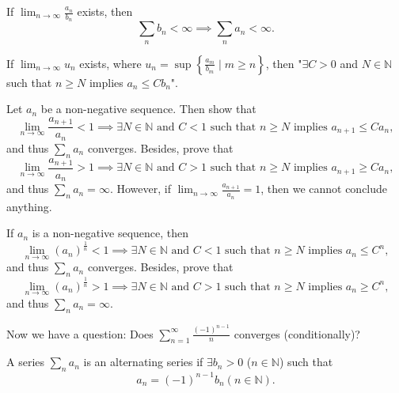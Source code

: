 \begin{corollary}
    If \(\lim_{n \to \infty} \frac{a_n}{b_n} \) exists, then 
    \[
        \sum_{n} b_n < \infty \implies \sum_{n} a_n < \infty. 
    \] 
\end{corollary}

\begin{exercise}
    If \(\lim_{n \to \infty} u_n\) exists, where \(u_n = \sup \left\{ \frac{a_m}{b_m} \mid m \ge n \right\} \), then "\(\exists C > 0\) and \(N \in \mathbb{N} \) such that \(n \ge N\) implies \(a_n \le C b_n\)".  
\end{exercise}
\begin{exercise}
    Let \(a_n\) be a non-negative sequence. Then show that 
    \[
        \lim_{n \to \infty} \frac{a_{n+1}}{a_n} < 1 \implies \exists N \in \mathbb{N} \text{ and } C < 1 \text{ such that } n \ge N \text{ implies } a_{n+1} \le C a_n,  
    \] and thus \(\sum_{n} a_n \) converges. Besides, prove that  
    \[
        \lim_{n \to \infty} \frac{a_{n+1}}{a_n} > 1 \implies \exists N \in \mathbb{N} \text{ and } C > 1 \text{ such that } n \ge N \text{ implies } a_{n+1} \ge C a_n,  
    \]and thus \(\sum_{n} a_n = \infty  \). However, if \(\lim_{n \to \infty} \frac{a_{n+1}}{a_n} = 1 \), then we cannot conclude anything.  
\end{exercise}
\begin{exercise}
    If \(a_n\) is a non-negative sequence, then 
    \[
        \lim_{n \to \infty} \left( a_n \right)^{\frac{1}{n}} < 1 \implies \exists N \in \mathbb{N} \text{ and } C < 1 \text{ such that } n \ge N \text{ implies } a_{n} \le C^n,
    \] and thus \(\sum_{n} a_n \) converges. Besides, prove that 
    \[
        \lim_{n \to \infty} \left( a_n \right)^{\frac{1}{n}} > 1 \implies \exists N \in \mathbb{N} \text{ and } C > 1 \text{ such that } n \ge N \text{ implies } a_{n} \ge C^n,
    \] and thus \(\sum_{n} a_n = \infty  \). 
\end{exercise}

Now we have a question: Does \(\sum_{n=1}^{\infty} \frac{(-1)^{n-1}}{n} \) converges (conditionally)?

\begin{definition}
    A series \(\sum_{n} a_n \) is an alternating series if \(\exists b_n > 0\) (\(n \in \mathbb{N} \)) such that
    \[
        a_n = (-1)^{n-1} b_n (n \in \mathbb{N} ).
    \]
\end{definition}


